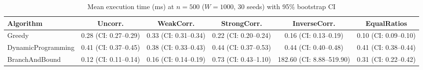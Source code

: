 \begin{table}[tb]
\centering
\caption{Mean execution time (ms) at $n=500$ ($W=1000$, 30 seeds) with 95\% bootstrap CI}
\label{tab:time-n500}
\begin{tabular}{lccccc}
\toprule
Algorithm & Uncorr. & WeakCorr. & StrongCorr. & InverseCorr. & EqualRatios \\
\midrule
Greedy & 0.28 (CI: 0.27–0.29) & 0.33 (CI: 0.31–0.34) & 0.22 (CI: 0.20–0.24) & 0.16 (CI: 0.13–0.19) & 0.10 (CI: 0.09–0.10) \\
DynamicProgramming & 0.41 (CI: 0.37–0.45) & 0.38 (CI: 0.33–0.43) & 0.44 (CI: 0.37–0.53) & 0.44 (CI: 0.40–0.48) & 0.41 (CI: 0.38–0.44) \\
BranchAndBound & 0.12 (CI: 0.11–0.14) & 0.16 (CI: 0.14–0.19) & 0.73 (CI: 0.43–1.10) & 182.60 (CI: 8.88–519.90) & 0.31 (CI: 0.22–0.42) \\
\bottomrule
\end{tabular}
\end{table}
